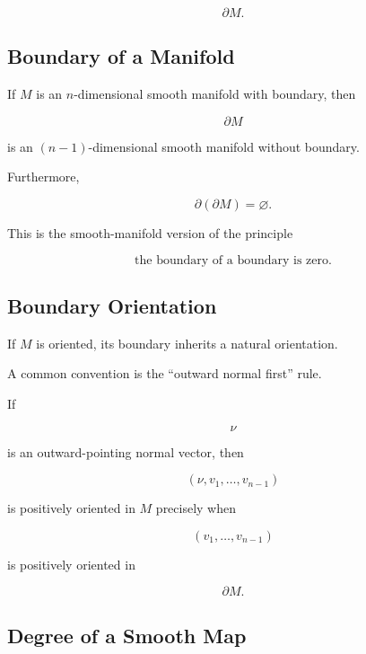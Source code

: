 \[
\boxed{
\partial M.
}
\]

\subsection{Boundary of a Manifold}
\label{subsec:boundary-manifold-differential}

If \(M\) is an \(n\)-dimensional smooth manifold with boundary, then

\[
\boxed{
\partial M
}
\]

is an \((n-1)\)-dimensional smooth manifold without boundary.

Furthermore,

\[
\boxed{
\partial(\partial M)=\varnothing.
}
\]

This is the smooth-manifold version of the principle

\[
\boxed{
\text{the boundary of a boundary is zero}.
}
\]

\subsection{Boundary Orientation}
\label{subsec:boundary-orientation}

If \(M\) is oriented, its boundary inherits a natural orientation.

A common convention is the ``outward normal first'' rule.

If

\[
\nu
\]

is an outward-pointing normal vector, then

\[
(\nu,v_1,\ldots,v_{n-1})
\]

is positively oriented in \(M\) precisely when

\[
(v_1,\ldots,v_{n-1})
\]

is positively oriented in

\[
\partial M.
\]

\subsection{Degree of a Smooth Map}
\label{subsec:differential-topology-degree}

